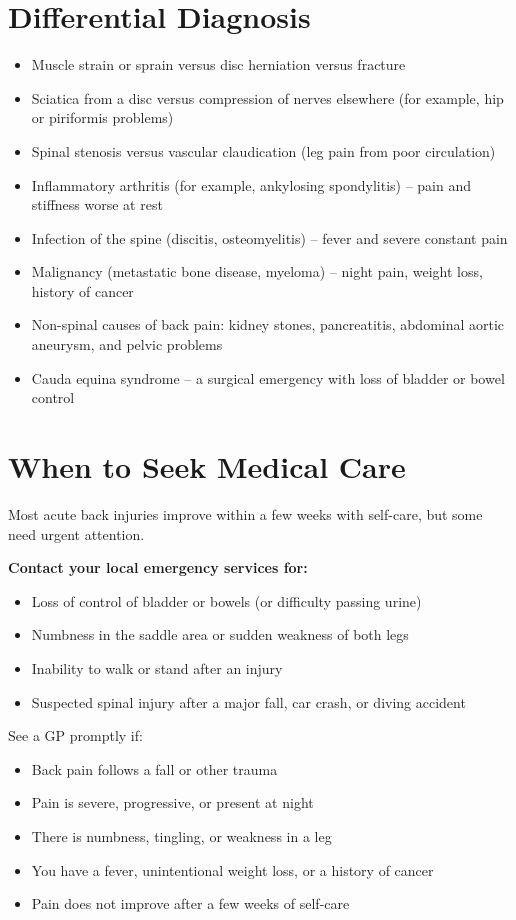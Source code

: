 \section*{Differential Diagnosis}
\begin{itemize}
    \item Muscle strain or sprain versus disc herniation versus fracture
    \item Sciatica from a disc versus compression of nerves elsewhere (for example, hip or piriformis problems)
    \item Spinal stenosis versus vascular claudication (leg pain from poor circulation)
    \item Inflammatory arthritis (for example, ankylosing spondylitis) -- pain and stiffness worse at rest
    \item Infection of the spine (discitis, osteomyelitis) -- fever and severe constant pain
    \item Malignancy (metastatic bone disease, myeloma) -- night pain, weight loss, history of cancer
    \item Non-spinal causes of back pain: kidney stones, pancreatitis, abdominal aortic aneurysm, and pelvic problems
    \item Cauda equina syndrome -- a surgical emergency with loss of bladder or bowel control
\end{itemize}

\section*{When to Seek Medical Care}
Most acute back injuries improve within a few weeks with self-care, but some need urgent attention.

\textbf{Contact your local emergency services for:}
\begin{itemize}
    \item Loss of control of bladder or bowels (or difficulty passing urine)
    \item Numbness in the saddle area or sudden weakness of both legs
    \item Inability to walk or stand after an injury
    \item Suspected spinal injury after a major fall, car crash, or diving accident
\end{itemize}

See a GP promptly if:
\begin{itemize}
    \item Back pain follows a fall or other trauma
    \item Pain is severe, progressive, or present at night
    \item There is numbness, tingling, or weakness in a leg
    \item You have a fever, unintentional weight loss, or a history of cancer
    \item Pain does not improve after a few weeks of self-care
\end{itemize}

